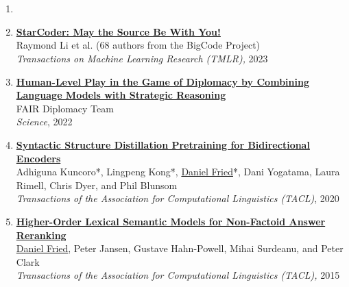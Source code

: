 \section{}
\begin{enumerate}[leftmargin=-1mm,partopsep=0pt]

  \item[]

\item \href{https://arxiv.org/abs/2305.06161}{\textbf{StarCoder: May the Source Be With You!}} \\
  Raymond Li et al. (68 authors from the BigCode Project)\\
  \emph{Transactions on Machine Learning Research (TMLR),} 2023

  \item \href{https://www.science.org/doi/10.1126/science.ade9097}{\textbf{Human-Level Play in the Game of Diplomacy by Combining Language Models with Strategic Reasoning}} \\
  FAIR Diplomacy Team \\
  \emph{Science}, 2022

  \item \href{https://www.mitpressjournals.org/doi/full/10.1162/tacl_a_00345}{\textbf{Syntactic Structure Distillation Pretraining for Bidirectional Encoders}} \\
    Adhiguna Kuncoro*, Lingpeng Kong*, \underline{Daniel Fried}*, Dani Yogatama, Laura Rimell, Chris Dyer, and Phil Blunsom \\
    \emph{Transactions of the Association for Computational Linguistics (TACL)}, 2020

  \item \href{https://people.eecs.berkeley.edu/~dfried/papers/tacl2015-qa.pdf}{\textbf{Higher-Order Lexical Semantic Models for Non-Factoid Answer Reranking}}\\
    \underline{Daniel Fried}, Peter Jansen, Gustave Hahn-Powell, Mihai Surdeanu, and Peter Clark \\
    \emph{Transactions of the Association for Computational Linguistics (TACL),} 2015



\end{enumerate}
